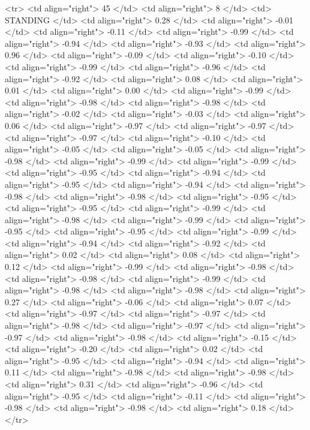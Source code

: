   <tr> <td align="right"> 45 </td> <td align="right">   8 </td> <td> STANDING </td> <td align="right"> 0.28 </td> <td align="right"> -0.01 </td> <td align="right"> -0.11 </td> <td align="right"> -0.99 </td> <td align="right"> -0.94 </td> <td align="right"> -0.93 </td> <td align="right"> 0.96 </td> <td align="right"> -0.09 </td> <td align="right"> -0.10 </td> <td align="right"> -0.99 </td> <td align="right"> -0.96 </td> <td align="right"> -0.92 </td> <td align="right"> 0.08 </td> <td align="right"> 0.01 </td> <td align="right"> 0.00 </td> <td align="right"> -0.99 </td> <td align="right"> -0.98 </td> <td align="right"> -0.98 </td> <td align="right"> -0.02 </td> <td align="right"> -0.03 </td> <td align="right"> 0.06 </td> <td align="right"> -0.97 </td> <td align="right"> -0.97 </td> <td align="right"> -0.97 </td> <td align="right"> -0.10 </td> <td align="right"> -0.05 </td> <td align="right"> -0.05 </td> <td align="right"> -0.98 </td> <td align="right"> -0.99 </td> <td align="right"> -0.99 </td> <td align="right"> -0.95 </td> <td align="right"> -0.94 </td> <td align="right"> -0.95 </td> <td align="right"> -0.94 </td> <td align="right"> -0.98 </td> <td align="right"> -0.98 </td> <td align="right"> -0.95 </td> <td align="right"> -0.95 </td> <td align="right"> -0.99 </td> <td align="right"> -0.98 </td> <td align="right"> -0.99 </td> <td align="right"> -0.95 </td> <td align="right"> -0.95 </td> <td align="right"> -0.99 </td> <td align="right"> -0.94 </td> <td align="right"> -0.92 </td> <td align="right"> 0.02 </td> <td align="right"> 0.08 </td> <td align="right"> 0.12 </td> <td align="right"> -0.99 </td> <td align="right"> -0.98 </td> <td align="right"> -0.98 </td> <td align="right"> -0.99 </td> <td align="right"> -0.98 </td> <td align="right"> -0.98 </td> <td align="right"> 0.27 </td> <td align="right"> -0.06 </td> <td align="right"> 0.07 </td> <td align="right"> -0.97 </td> <td align="right"> -0.97 </td> <td align="right"> -0.98 </td> <td align="right"> -0.97 </td> <td align="right"> -0.97 </td> <td align="right"> -0.98 </td> <td align="right"> -0.15 </td> <td align="right"> -0.20 </td> <td align="right"> 0.02 </td> <td align="right"> -0.95 </td> <td align="right"> -0.94 </td> <td align="right"> 0.11 </td> <td align="right"> -0.98 </td> <td align="right"> -0.98 </td> <td align="right"> 0.31 </td> <td align="right"> -0.96 </td> <td align="right"> -0.95 </td> <td align="right"> -0.11 </td> <td align="right"> -0.98 </td> <td align="right"> -0.98 </td> <td align="right"> 0.18 </td> </tr>
